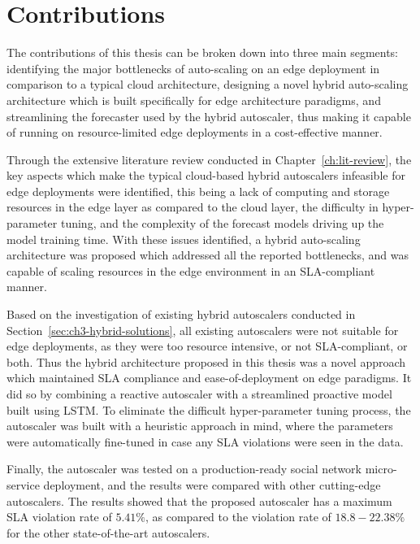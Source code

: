 \section{Contributions}
\label{sec:ch7-contribution}

The contributions of this thesis can be broken down into three main segments: identifying the major bottlenecks of auto-scaling on an edge deployment in comparison to a typical cloud architecture, designing a novel hybrid auto-scaling architecture which is built specifically for edge architecture paradigms, and streamlining the forecaster used by the hybrid autoscaler, thus making it capable of running on resource-limited edge deployments in a cost-effective manner.\par

Through the extensive literature review conducted in Chapter~\ref{ch:lit-review}, the key aspects which make the typical cloud-based hybrid autoscalers infeasible  for edge deployments were identified, this being a lack of computing and storage resources in the edge layer as compared to the cloud layer, the difficulty in hyper-parameter tuning, and the complexity of the forecast models driving up the model training time. With these issues identified, a hybrid auto-scaling architecture was proposed which addressed all the reported bottlenecks, and was capable of scaling resources in the edge environment in an SLA-compliant manner.\par

Based on the investigation of existing hybrid autoscalers conducted in Section~\ref{sec:ch3-hybrid-solutions}, all existing autoscalers were not suitable for edge deployments, as they were too resource intensive, or not SLA-compliant, or both. Thus the hybrid architecture proposed in this thesis was a novel approach which maintained SLA compliance and ease-of-deployment on edge paradigms. It did so by combining a reactive autoscaler with a streamlined proactive model built using LSTM. To eliminate the difficult hyper-parameter tuning process, the autoscaler was built with a heuristic approach in mind, where the parameters were automatically fine-tuned in case any SLA violations were seen in the data.\par

Finally, the autoscaler was tested on a production-ready social network micro-service deployment, and the results were compared with other cutting-edge autoscalers. The results showed that the proposed autoscaler has a maximum SLA violation rate of $5.41\%$, as compared to the violation rate of $18.8-22.38\%$ for the other state-of-the-art autoscalers.\par

